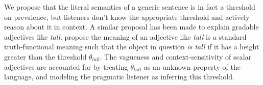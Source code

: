 \documentclass[10pt,letterpaper]{article}
\begin{document}


We propose that the literal semantics of a generic sentence is in fact a threshold on prevalence, but listeners don't know the appropriate threshold and actively reason about it in context. 
A similar proposal has been made to explain gradable adjectives like \emph{tall}. 
  propose the meaning of an adjective like \emph{tall} is a standard truth-functional meaning such that the object in question \emph{is tall} if it has a height greater than the threshold $\theta_{tall}$. 
The vagueness and context-sensitivity of scalar adjectives are accounted for by treating $\theta_{tall}$ as an unknown property of the language, and modeling the pragmatic listener as inferring this threshold.
 




%
%			
%			
%			
%			
%			
%			
%			
\end{document}
